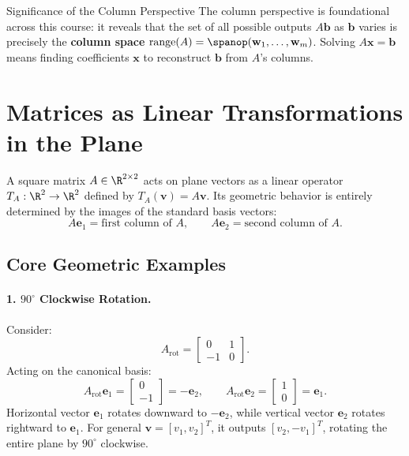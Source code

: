 \begin{noteblock}{Significance of the Column Perspective}
The column perspective is foundational across this course: it reveals that the set of all possible outputs $A \mathbf{b}$ as $\mathbf{b}$ varies is precisely the \textbf{column space} $\mathrm{range}(A) = \spanop(\mathbf{w}_1, \dots, \mathbf{w}_m)$. Solving $A \mathbf{x} = \mathbf{b}$ means finding coefficients $\mathbf{x}$ to reconstruct $\mathbf{b}$ from $A$'s columns.
\end{noteblock}

\FloatBarrier
\section{Matrices as Linear Transformations in the Plane}

A square matrix $A \in \R^{2 \times 2}$ acts on plane vectors as a linear operator $T_A: \R^2 \to \R^2$ defined by $T_A(\mathbf{v}) = A \mathbf{v}$. Its geometric behavior is entirely determined by the images of the standard basis vectors:
\begin{equation}
    A \mathbf{e}_1 = \text{first column of } A, \qquad A \mathbf{e}_2 = \text{second column of } A.
\end{equation}

\subsection{Core Geometric Examples}

\paragraph{1. $90^\circ$ Clockwise Rotation.}
Consider:
\begin{equation}
    A_{\text{rot}} = \begin{bmatrix} 0 & 1 \\ -1 & 0 \end{bmatrix}.
\end{equation}
Acting on the canonical basis:
\begin{equation}
    A_{\text{rot}} \mathbf{e}_1 = \begin{bmatrix} 0 \\ -1 \end{bmatrix} = -\mathbf{e}_2, \qquad A_{\text{rot}} \mathbf{e}_2 = \begin{bmatrix} 1 \\ 0 \end{bmatrix} = \mathbf{e}_1.
\end{equation}
Horizontal vector $\mathbf{e}_1$ rotates downward to $-\mathbf{e}_2$, while vertical vector $\mathbf{e}_2$ rotates rightward to $\mathbf{e}_1$. For general $\mathbf{v} = [v_1, v_2]^T$, it outputs $[v_2, -v_1]^T$, rotating the entire plane by $90^\circ$ clockwise.

